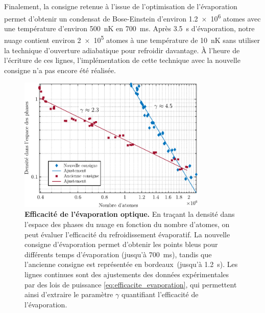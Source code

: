 Finalement, la consigne retenue à l'issue de l'optimisation de l'évaporation permet d'obtenir un condensat de Bose-Einstein d'environ \SI{1.2e6}{} atomes avec une température d'environ \SI{500}{\nano\kelvin} en \SI{700}{\milli\second}. Après \SI{3.5}{\second} d'évaporation, notre nuage contient environ \SI{2e5}{} atomes à une température de \SI{10}{\nano\kelvin} sans utiliser la technique d'ouverture adiabatique pour refroidir davantage. À l'heure de l'écriture de ces lignes, l'implémentation de cette technique avec la nouvelle consigne n'a pas encore été réalisée.


\begin{figure}
\centering
\includegraphics[width=0.8\textwidth]{Fig/Modif_exp/efficacité_évaporation_optique.pdf}
\caption{\textbf{Efficacité de l'évaporation optique.} En traçant la densité dans l'espace des phases du nuage en fonction du nombre d'atomes, on peut évaluer l'efficacité du refroidissement évaporatif. La nouvelle consigne d'évaporation permet d'obtenir les points bleus pour différents temps d'évaporation (jusqu'à \SI{700}{\milli\second}), tandis que l'ancienne consigne est représentée en bordeaux\protect\footnotemark\ (jusqu'à \SI{1.2}{\second}). Les lignes continues sont des ajustements des données expérimentales par des lois de puissance \ref{eq:efficacite_evaporation}, qui permettent ainsi d'extraire le paramètre $\gamma$ quantifiant l'efficacité de l'évaporation.}
\label{fig:efficacite_evaporation_optique}
\end{figure}

